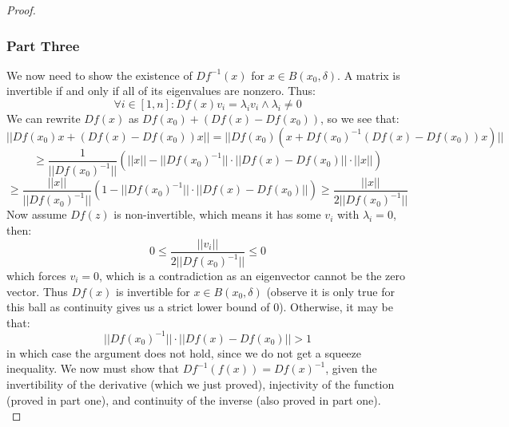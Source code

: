 \documentclass[10pt,letterpaper]{article} %
\begin{document}
\begin{proof}
\subsubsection*{Part Three}
We now need to show the existence of $Df^{-1}(x)$ for $x \in B(x_0, \delta)$. A matrix is invertible if and only if all of its eigenvalues are nonzero. Thus:
\begin{equation*}
\forall i \in [1, n]: Df(x)v_i = \lambda_iv_i \land \lambda_i \neq 0
\end{equation*}
We can rewrite $Df(x)$ as $Df(x_0) + (Df(x) - Df(x_0))$, so we see that:
\begin{equation*}
||Df(x_0)x + (Df(x) - Df(x_0))x|| = ||Df(x_0)(x + Df(x_0)^{-1}(Df(x) - Df(x_0))x)||
\end{equation*}
\begin{equation*}
\geqslant \frac{1}{||Df(x_0)^{-1}||}(||x|| - ||Df(x_0)^{-1}|| \cdot ||Df(x) - Df(x_0)|| \cdot ||x||)
\end{equation*}
\begin{equation*}
\geqslant \frac{||x||}{||Df(x_0)^{-1}||}(1 - ||Df(x_0)^{-1}|| \cdot ||Df(x) - Df(x_0)||) \geqslant \frac{||x||}{2||Df(x_0)^{-1}||}
\end{equation*}
Now assume $Df(z)$ is non-invertible, which means it has some $v_i$ with $\lambda_i = 0$, then:
\begin{equation*}
0 \leqslant \frac{||v_i||}{2||Df(x_0)^{-1}||} \leqslant 0
\end{equation*}
which forces $v_i = 0$, which is a contradiction as an eigenvector cannot be the zero vector. Thus $Df(x)$ is invertible for $x \in B(x_0, \delta)$ (observe it is only true for this ball as continuity gives us a strict lower bound of $0$). Otherwise, it may be that:
\begin{equation*}
||Df(x_0)^{-1}|| \cdot ||Df(x) - Df(x_0)|| > 1
\end{equation*}
in which case the argument does not hold, since we do not get a squeeze inequality. We now must show that $Df^{-1}(f(x)) = Df(x)^{-1}$, given the invertibility of the derivative (which we just proved), injectivity of the function (proved in part one), and continuity of the inverse (also proved in part one).\\


\end{proof}
\end{document}

